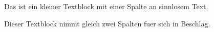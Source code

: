 \documentclass{scrartcl}
\begin{document}
\begin{row}{3}{2}
  \noindent%
  \begin{cell}{1}
  Das ist ein kleiner Textblock mit
  einer Spalte an sinnlosem Text.
  \end{cell}
  \begin{cell}{2}
  Dieser Textblock nimmt gleich zwei
  Spalten fuer sich in Beschlag.
  \end{cell}
\end{row}
\end{document}
